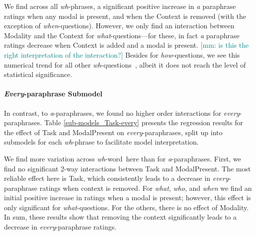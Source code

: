\documentclass[12pt,letterpaper,table,svgnames,dvipsnames]{article}
\newcommand{\mm}[1]{\textcolor{teal}{[mm: #1]}}
\newcommand{\whqs}{\emph{wh}-questions~}
\newcommand{\whw}{\emph{wh}-word~}
\begin{document}
We find across all \emph{wh}-phrases, a significant positive increase in \emph{a} paraphrase ratings when any modal is present, and when the Context is removed (with the exception of \emph{when}-questions). However, we only find an interaction between Modality and the Context for \emph{what}-questions---for these, in fact \emph{a} paraphrase ratings decrease when Context is added and a modal is present. \mm{is this the right interpretation of the interaction?} Besides for \emph{how}-questions, we see this numerical trend for all other \whqs, albeit it does not reach the level of statistical significance.

\paragraph{\emph{Every}-paraphrase Submodel}

In contrast, to \emph{a}-paraphrases, we found no higher order interactions for \emph{every}-paraphrases. Table \ref{sub-models_Task-every} presents the regression results for the effect of Task and ModalPresent on \emph{every}-paraphrases, split up into submodels for each \emph{wh}-phrase to facilitate model interpretation.

We find more variation across \whw here than for \emph{a}-paraphrases. First, we find no significant 2-way interactions between Task and ModalPresent. The most reliable effect here is Task, which consistently leads to a decrease in \emph{every}-paraphrase ratings when context is removed. For \emph{what}, \emph{who}, and \emph{when} we find an initial positive increase in ratings when a modal is present; however, this effect is only significant for \emph{what}-questions. For the others, there is no effect of Modality. In sum, these results show that removing the context significantly leads to a decrease in \emph{every}-paraphrase ratings.
\end{document}

